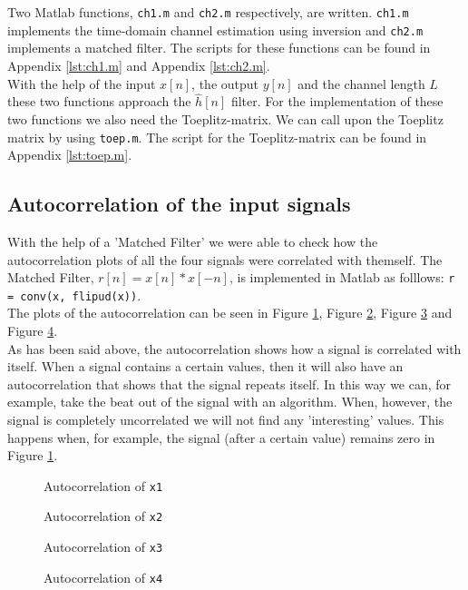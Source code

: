 \documentclass[final]{scrreprt} %
\begin{document}
Two Matlab functions, \texttt{ch1.m} and \texttt{ch2.m} respectively, are written. 
\texttt{ch1.m} implements the time-domain channel estimation using inversion and \texttt{ch2.m} implements a matched filter.
The scripts for these functions can be found in Appendix \ref{lst:ch1.m} and Appendix \ref{lst:ch2.m}.
\\
With the help of the input $x[n]$, the output $y[n]$ and the channel length $L$ these two functions approach the $\hat{h}[n]$ filter. 
For the implementation of these two functions we also need the Toeplitz-matrix. 
We can call upon the Toeplitz matrix by using \texttt{toep.m}. 
The script for the Toeplitz-matrix can be found in Appendix \ref{lst:toep.m}.

\subsection{Autocorrelation of the input signals}

With the help of a 'Matched Filter' we were able to check how the autocorrelation plots of all the four signals were correlated with themself.
The Matched Filter, $r[n]=x[n]*x[-n]$, is implemented in Matlab as folllows: \texttt{r = conv(x, flipud(x))}.
\\
The plots of the autocorrelation can be seen in Figure \ref{fig:auto1}, Figure \ref{fig:auto2}, Figure \ref{fig:auto3} and Figure \ref{fig:auto4}.
\\
As has been said above, the autocorrelation shows how a signal is correlated with itself. 
When a signal contains a certain values, then it will also have an autocorrelation that shows that the signal repeats itself.
In this way we can, for example, take the beat out of the signal with an algorithm.
When, however, the signal is completely uncorrelated we will not find any 'interesting' values.
This happens when, for example, the signal (after a certain value) remains zero in Figure \ref{fig:auto1}.


\begin{figure}[H]
	\centering
    	\setlength\figureheight{6cm}
    	\setlength\figurewidth{10cm}
    	    	
    	\caption{Autocorrelation of \texttt{x1}}
    	\label{fig:auto1}
\end{figure}
\begin{figure}[H]
	\centering
    	\setlength\figureheight{6cm}
    	\setlength\figurewidth{10cm}
    	    	
    	\caption{Autocorrelation of \texttt{x2}}
    	\label{fig:auto2}
\end{figure}
\begin{figure}[H]
	\centering
    	\setlength\figureheight{6cm}
    	\setlength\figurewidth{10cm}
    	    	
    	\caption{Autocorrelation of \texttt{x3}}
    	\label{fig:auto3}
\end{figure}
\begin{figure}[H]
	\centering
    	\setlength\figureheight{6cm}
    	\setlength\figurewidth{10cm}
    	    	
    	\caption{Autocorrelation of \texttt{x4}}
    	\label{fig:auto4}
\end{figure}
\end{document}
